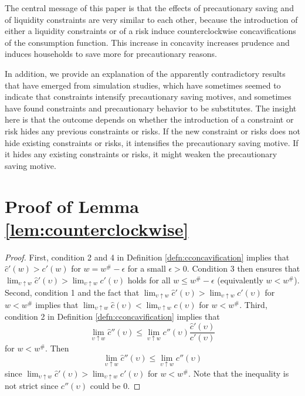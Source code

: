 \documentclass[titlepage]{\econtex}
\begin{document}
The central message of this paper is that the effects of precautionary saving and of liquidity constraints are very similar to each other, because the introduction of either a liquidity constraints or of a risk induce counterclockwise concavifications of the consumption function. This increase in concavity increases prudence and induces households to save more for precautionary reasons. 

In addition, we provide an explanation of the apparently contradictory results that have emerged from simulation studies, which have sometimes seemed to indicate that constraints intensify precautionary saving motives, and sometimes have found constraints and precautionary behavior to be substitutes. The insight here is that the outcome depends on whether the introduction of a constraint or risk hides any previous constraints or risks. If the new constraint or risks does not hide existing constraints or risks, it intensifies the precautionary saving motive. If it hides any existing constraints or risks, it might weaken the precautionary saving motive.  




\vfill\eject
\appendix



  
\section{Proof of Lemma \ref{lem:counterclockwise}} \label{app:counterclockwise}
\begin{proof} First, condition 2 and 4 in Definition \ref{defn:cconcavification} implies that $\hat{c}'(w) > c'(w)$ for $w = w^{\#} - \epsilon$ for a small $\epsilon > 0$. Condition 3 then ensures that $\lim_{\upsilon \uparrow w} \hat{c}'(\upsilon) > \lim_{\upsilon \uparrow w} c'(\upsilon)$ holds for all $w \leq w^{\#}-\epsilon$ (equivalently $w < w^{\#}$). Second, condition 1 and the fact that $\lim_{\upsilon \uparrow w} \hat{c}'(\upsilon) > \lim_{\upsilon \uparrow w} c'(\upsilon)$ for $w < w^{\#}$ implies that $\lim_{\upsilon \uparrow w} \hat{c}(\upsilon) < \lim_{\upsilon \uparrow w}c(\upsilon)$ for $w < w^{\#}$. Third, condition 2 in Definition \ref{defn:cconcavification} implies that $$\lim_{\upsilon \uparrow w}\hat{c}''(\upsilon) \leq \lim_{\upsilon \uparrow w} c''(\upsilon)\frac{\hat{c}'(\upsilon)}{c'(\upsilon)}$$ for $w < w^{\#}$. Then $$\lim_{\upsilon \uparrow w} \hat{c}''(\upsilon) \leq \lim_{\upsilon \uparrow w} c''(\upsilon)$$ since $\lim_{\upsilon \uparrow w}\hat{c}'(\upsilon) > \lim_{\upsilon \uparrow w} c'(\upsilon)$ for $w < w^{\#}$. Note that the inequality is not strict since $c''(\upsilon)$ could be 0.  
\end{proof}
\end{document}
